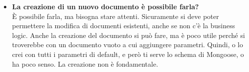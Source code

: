 \begin{itemize}
		\item
		{\bfseries La creazione di un nuovo documento è possibile farla?} \\
		È possibile farla, ma bisogna stare attenti. Sicuramente si deve poter permettere la modifica di documenti esistenti, anche se non c'è la business logic. Anche la creazione del documento si può fare, ma è poco utile perché si troverebbe con un documento vuoto a cui aggiungere parametri. Quindi, o lo crei con tutti i parametri di default, e però ti serve lo schema di Mongoose, o ha poco senso. La creazione non è fondamentale.
		
	\end{itemize}